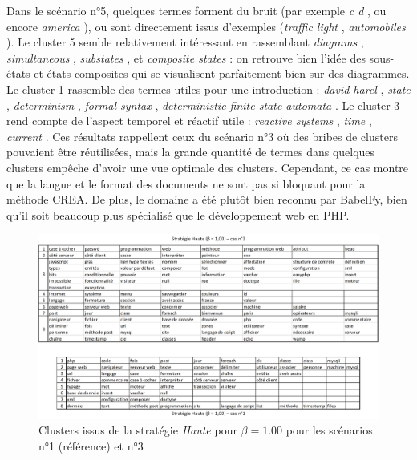 \bigskip


Dans le scénario n°5, quelques termes forment du bruit (par exemple \og \textit{c d} \fg, ou encore \og \textit{america} \fg), ou sont directement issus d'exemples (\og \textit{traffic light} \fg, \og \textit{automobiles} \fg).
Le cluster 5 semble relativement intéressant en rassemblant \og \textit{diagrams} \fg, \og \textit{simultaneous} \fg, \og \textit{substates} \fg, et \og \textit{composite states} \fg : on retrouve bien l'idée des sous-états et états composites qui se visualisent parfaitement bien sur des diagrammes.
Le cluster 1 rassemble des termes utiles pour une introduction : \og \textit{david harel} \fg, \og \textit{state} \fg, \og \textit{determinism} \fg, \og \textit{formal syntax} \fg, \og \textit{deterministic finite state automata} \fg.
Le cluster 3 rend compte de l'aspect temporel et réactif utile : \og \textit{reactive systems} \fg, \og \textit{time} \fg, \og \textit{current} \fg.
Ces résultats rappellent ceux du scénario n°3 où des bribes de clusters pouvaient être réutilisées, mais la grande quantité de termes dans quelques clusters empêche d'avoir une vue optimale des clusters.
Cependant, ce cas montre que la langue et le format des documents ne sont pas si bloquant pour la méthode CREA.
De plus, le domaine a été plutôt bien reconnu par BabelFy, bien qu'il soit beaucoup plus spécialisé que le développement web en PHP.


\begin{figure}[htb!]
\centering
\centerline{  %
\includegraphics[scale=0.7]{4-Experiences/images/cas-3/clusters-PHP-automatic-18-S=H.png}
}
\caption{Clusters issus de la stratégie \textit{Haute} pour $ \beta = 1.00 $ pour les scénarios n°1 (référence) et n°3}
\label{figure:4-cas-3-PII-ClustersStrategieHaute}
\end{figure}




